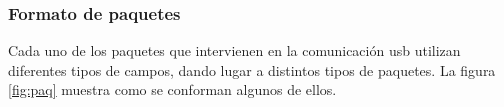 %	
	
\subsubsection{Formato de paquetes}
	Cada uno de los paquetes que intervienen en la comunicación \acrshort{usb} utilizan diferentes tipos de campos, dando lugar a distintos tipos de paquetes. La figura \ref{fig:paq} muestra como se conforman algunos de ellos.%

